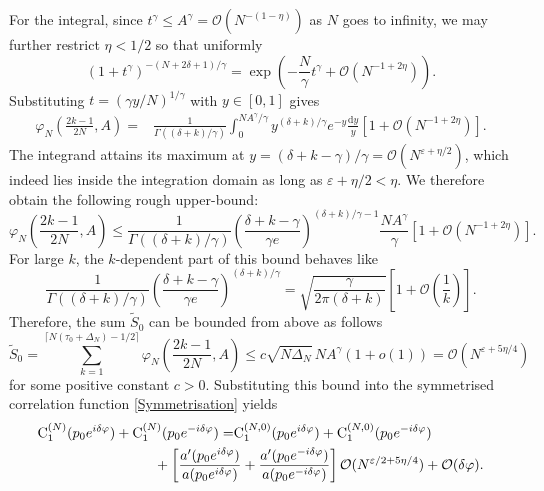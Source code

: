 \documentclass[pdflatex,sn-mathphys-num]{sn-jnl}
\theoremstyle{thmstyleone}
\numberwithin{equation}{section}
\newcommand{\Cc}{\mathrm{C}}
\begin{document}
For the integral, since $t^\gamma\leq A^\gamma=\mathcal{O}(N^{-(1-\eta)})$ as $N$ goes to infinity, we may further restrict $\eta<1/2$ so that uniformly
\begin{equation}
 \left(1 + t^\gamma \right)^{ -(N+2\delta+1)/\gamma}=\exp\left(-\frac{N}{\gamma} t^\gamma+\mathcal{O}(N^{-1+2\eta})\right).
\end{equation}
Substituting $t=(\gamma y/N)^{1/\gamma}$ with $y\in[0,1]$ gives
\begin{equation}
\begin{split}
\varphi_{N}\left(\frac{2k-1}{2N},A\right)=&\frac{1}{\Gamma((\delta+k)/\gamma)}\int_0^{NA^\gamma/\gamma} y^{(\delta+k)/\gamma}e^{- y}\frac{\mathrm{d}y}{y}\left[1+\mathcal{O}(N^{-1+2\eta})\right].
\end{split}
\end{equation}
The integrand attains its maximum at $y=(\delta+k-\gamma)/\gamma=\mathcal{O}(N^{\varepsilon+\eta/2})$, which indeed lies inside the integration domain as long as $\varepsilon+\eta/2<\eta$.
We therefore obtain the following rough upper-bound: 
\begin{equation}
\varphi_{N}\left(\frac{2k-1}{2N},A\right)\leq\frac{1}{\Gamma((\delta+k)/\gamma)}\left(\frac{\delta+k-\gamma}{\gamma e}\right)^{(\delta+k)/\gamma-1}\frac{NA^\gamma}{\gamma} \left[1+\mathcal{O}(N^{-1+2\eta})\right].
\end{equation}
For large $k$, the $k$-dependent part of this bound behaves like
\begin{equation}
\frac{1}{\Gamma((\delta+k)/\gamma)}\left(\frac{\delta+k-\gamma}{\gamma e}\right)^{(\delta+k)/\gamma}=\sqrt{\frac{\gamma}{2\pi(\delta+k)}}\left[1+\mathcal{O}\left(\frac{1}{k}\right)\right].
\end{equation}
Therefore, the sum $\widetilde{S}_0$ can be bounded from above as follows
\begin{equation}
\widetilde{S}_0=\sum_{k=1}^{\lceil N(\tau_0+\Delta_N)-1/2\rceil}\varphi_{N}\left(\frac{2k-1}{2N},A\right)\leq c\sqrt{N\Delta_N}\,NA^\gamma(1+o(1))=\mathcal{O}(N^{\varepsilon+5\eta/4})
\end{equation}
for some positive constant $c>0$. 
Substituting this bound into the symmetrised correlation function \eqref{Symmetrisation} yields
\begin{equation}
\begin{split}
\Cc_1^{(N)}(p_0e^{i\delta \varphi})+\Cc_1^{(N)}(p_0e^{-i\delta \varphi})=&\Cc_1^{(N,0)}(p_0e^{i\delta \varphi})+\Cc_1^{(N,0)}(p_0e^{-i\delta \varphi})\\
&\hspace*{-2cm}+\left[\frac{a'(p_0e^{i\delta \varphi})}{a(p_0e^{i\delta \varphi})}+\frac{a'(p_0e^{-i\delta \varphi})}{a(p_0e^{-i\delta \varphi})}\right]\mathcal{O}(N^{\varepsilon/2+5\eta/4})+\mathcal{O}(\delta\varphi).
\end{split}
\end{equation}
\end{document}
